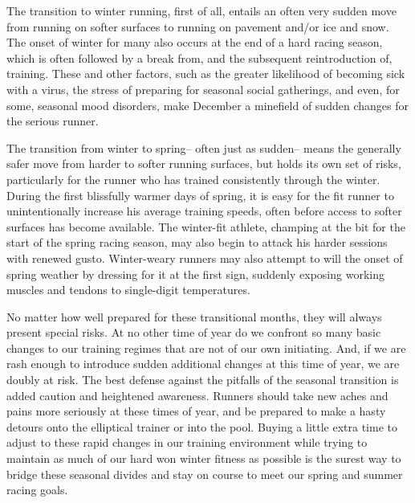 The transition to winter running, first of all, entails an often very sudden move from running on softer surfaces to running on pavement and/or ice and snow. The onset of winter for many also occurs at the end of a hard racing season, which is often followed by a break from, and the subsequent reintroduction of, training. These and other factors, such as the greater likelihood of becoming sick with a virus, the stress of preparing for seasonal social gatherings, and even, for some, seasonal mood disorders, make December a minefield of sudden changes for the serious runner.

The transition from winter to spring-- often just as sudden-- means the generally safer move from harder to softer running surfaces, but holds its own set of risks, particularly for the runner who has trained consistently through the winter. During the first blissfully warmer days of spring, it is easy for the fit runner to unintentionally increase his average training speeds, often before access to softer surfaces has become available. The winter-fit athlete, champing at the bit for the start of the spring racing season, may also begin to attack his harder sessions with renewed gusto. Winter-weary runners may also attempt to will the onset of spring weather by dressing for it at the first sign, suddenly exposing working muscles and tendons to single-digit temperatures.

No matter how well prepared for these transitional months, they will always present special risks. At no other time of year do we confront so many basic changes to our training regimes that are not of our own initiating. And, if we are rash enough to introduce sudden additional changes at this time of year, we are doubly at risk. The best defense against the pitfalls of the seasonal transition is added caution and heightened awareness. Runners should take new aches and pains more seriously at these times of year, and be prepared to make a hasty detours onto the elliptical trainer or into the pool. Buying a little extra time to adjust to these rapid changes in our training environment while trying to maintain as much of our hard won winter fitness as possible is the surest way to bridge these seasonal divides and stay on course to meet our spring and summer racing goals.




